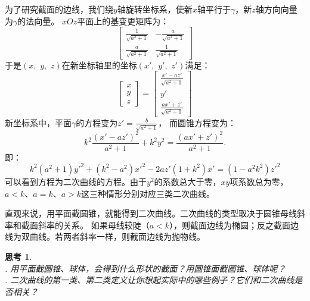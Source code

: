 \documentclass[12pt,UTF8]{ctexbook}
\theoremstyle{definition}
\theoremstyle{plain}
\newtheorem{sk}{思考}[section]
\begin{document}
为了研究截面的边线，我们绕$y$轴旋转坐标系，使新$x$轴平行于$\gamma$，新$z$轴方向向量为$\gamma$的法向量。
$xOz$平面上的基变更矩阵为：
$$
\begin{bmatrix}
    \frac{1}{\sqrt{a^2+1}} & -\frac{a}{\sqrt{a^2+1}} \\
    \frac{a}{\sqrt{a^2+1}} & \frac{1}{\sqrt{a^2+1}}
\end{bmatrix}
$$
于是$(x,\,\,y,\,\,z)$在新坐标轴里的坐标$(x',\,\,y',\,\,z')$满足：
$$
\begin{bmatrix}
    x \\ y \\ z
\end{bmatrix}
= 
\begin{bmatrix}
    \frac{x' - az'}{\sqrt{a^2+1}} \\ y' \\ \frac{ax' + z'}{\sqrt{a^2+1}}
\end{bmatrix}
$$
新坐标系中，平面$\gamma$的方程变为$z'=\frac{b}{\sqrt{a^2+1}}$，
而圆锥方程变为：
$$ k^2\frac{(x' - az')^2}{a^2+1} + k^2y^2 = \frac{(ax' + z')^2}{a^2+1} . $$
即：
$$ k^2(a^2+1)y'^2 + (k^2 - a^2)x'^2 - 2az'(1 + k^2)x' = (1 - a^2k^2)z'^2 $$
可以看到方程为二次曲线的方程。由于$y^2$的系数总大于零，$xy$项系数总为零，
$a<k$、$a=k$、$a>k$这三种情形分别对应三类二次曲线。


直观来说，用平面截圆锥，就能得到二次曲线。二次曲线的类型取决于圆锥母线斜率和截面斜率的关系。
如果母线较陡（$a<k$），则截面边线为椭圆；反之截面边线为双曲线。若两者斜率一样，则截面边线为抛物线。

\begin{sk}
    \mbox{} \\
    . 用平面截圆锥、球体，会得到什么形状的截面？用圆锥面截圆锥、球体呢？\\
    . 二次曲线的第一类、第二类定义让你想起实际中的哪些例子？它们和二次曲线是否相关？
\end{sk}
\end{document}
